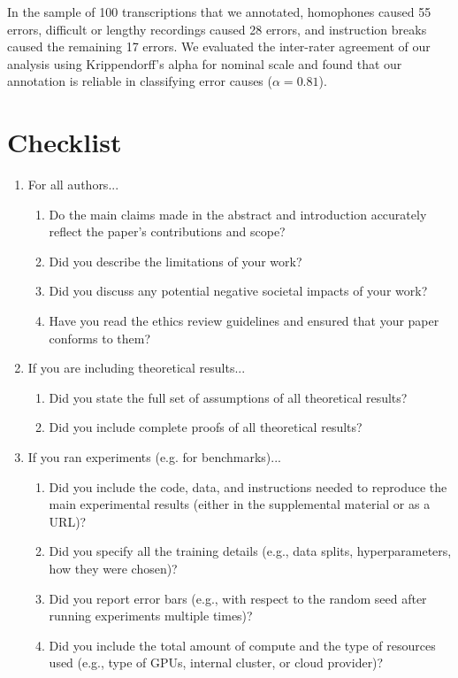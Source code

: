 \documentclass{article}
\begin{document}
In the sample of 100 transcriptions that we annotated, homophones caused 55 errors, difficult or lengthy recordings caused 28 errors, and instruction breaks caused the remaining 17 errors. We evaluated the inter-rater agreement of our analysis using Krippendorff's alpha for nominal scale and found that our annotation is reliable in classifying error causes ($\alpha = 0.81$).

\clearpage

\section*{Checklist}

\begin{enumerate}

\item For all authors...
\begin{enumerate}
  \item Do the main claims made in the abstract and introduction accurately reflect the paper's contributions and scope?
    \answerYes{}
  \item Did you describe the limitations of your work?
    \answerYes{}
  \item Did you discuss any potential negative societal impacts of your work?
    \answerYes{}
  \item Have you read the ethics review guidelines and ensured that your paper conforms to them?
    \answerYes{}
\end{enumerate}

\item If you are including theoretical results...
\begin{enumerate}
  \item Did you state the full set of assumptions of all theoretical results?
    \answerNA{}
	\item Did you include complete proofs of all theoretical results?
    \answerNA{}
\end{enumerate}

\item If you ran experiments (e.g. for benchmarks)...
\begin{enumerate}
  \item Did you include the code, data, and instructions needed to reproduce the main experimental results (either in the supplemental material or as a URL)?
    \answerYes{}
  \item Did you specify all the training details (e.g., data splits, hyperparameters, how they were chosen)?
    \answerNA{}
	\item Did you report error bars (e.g., with respect to the random seed after running experiments multiple times)?
    \answerNA{}
	\item Did you include the total amount of compute and the type of resources used (e.g., type of GPUs, internal cluster, or cloud provider)?
    \answerNA{}
\end{enumerate}


\end{enumerate}
\end{document}
